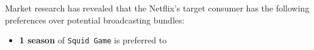 \begin{question}[type=exam]{4}
  Market research has revealed that the Netflix's target consumer has the following preferences over potential broadcasting bundles:
  \begin{itemize}
    \item \textbf{1 season} of \texttt{Squid Game} is preferred to 
  \end{itemize}
\end{question}
